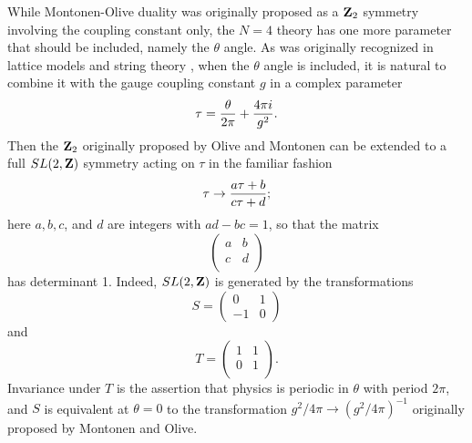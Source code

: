 \documentclass[12pt]{article}
\numberwithin{equation}{section}
\begin{document}
While Montonen-Olive duality was originally proposed as a ${\bf Z}_2$
symmetry involving the coupling constant only, the $N=4$ theory
has one more parameter that should be included, namely the $\theta$
angle.  As was originally recognized in lattice models \cite{cardy,shapere}
and string theory \cite{font,rey},
when the $\theta$ angle is included, it is natural
to combine it with the gauge coupling constant $g$ in a complex parameter
\begin{equation}
  \label{nimbo}
  \tau ={\theta \over 2\pi}+{4\pi i\over g^2}.
\end{equation}
Then the ${\bf Z}_2$ originally proposed by Olive and Montonen
can be extended to a full $SL(2,{\bf Z})$ symmetry
acting on $\tau$ in the familiar fashion
\begin{equation}
  \label{kimbo}
  \tau\to {a\tau+b\over c\tau+d};
\end{equation}
here $a,b,c$, and $d$ are integers with $ad-bc=1$, so that
the matrix
\begin{equation}
  \label{imbo}
  \begin{pmatrix}a & b \\ c& d\\
  \end{pmatrix}
\end{equation}
has determinant 1.
Indeed, $SL(2,{\bf Z})$ is generated by the transformations
\begin{equation}
  \label{mbo}
  S=
  \begin{pmatrix} 0 & 1 \\-1 & 0
  \end{pmatrix}
\end{equation}
and
\begin{equation}
  \label{pimbo}
  T=
  \begin{pmatrix}1 & 1\\ 0 & 1\\
  \end{pmatrix}.
\end{equation}
Invariance under $T$ is the assertion that physics is periodic in
$\theta$ with period $2\pi$, and $S$ is equivalent at $\theta=0$ to the
transformation $g^2/4\pi \to (g^2/4\pi)^{-1}$
originally proposed by Montonen and Olive.
\end{document}
